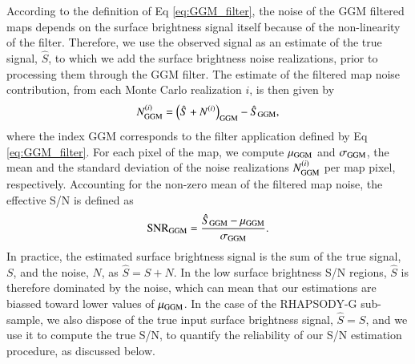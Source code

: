 \documentclass[traditabstract]{aa}
\begin{document}
According to the definition of Eq \ref{eq:GGM_filter}, the noise of the GGM filtered maps depends on the surface brightness signal itself because of the non-linearity of the filter. Therefore, we use the observed signal as an estimate of the true signal, $\hat{S}$, to which we add the surface brightness noise realizations, prior to processing them through the GGM filter. The estimate of the filtered map noise contribution, from each Monte Carlo realization $i$, is then given by
\begin{equation}
        N^{(i)}_{\rm GGM} = \left(\hat{S} + N^{(i)}\right)_{\rm GGM} -  \hat{S}_{\rm GGM},
        \label{eq:GGM_filter_noise}
\end{equation}
where the index GGM corresponds to the filter application defined by Eq \ref{eq:GGM_filter}. For each pixel of the map, we compute $\mu_{\rm GGM}$ and $\sigma_{\rm GGM}$, the mean and the standard deviation of the noise realizations $N^{(i)}_{\rm GGM}$ per map pixel, respectively. Accounting for the non-zero mean of the filtered map noise, the effective S/N is defined as 
\begin{equation}
{\rm SNR}_{\rm GGM} = \frac{\hat{S}_{\rm GGM} - \mu_{\rm GGM}}{\sigma_{\rm GGM}}.
        \label{eq:GGM_filter_snr}
\end{equation}
In practice, the estimated surface brightness signal is the sum of the true signal, $S$, and the noise, $N$, as $\hat{S} = S + N$. In the low surface brightness S/N regions, $\hat{S}$ is therefore dominated by the noise, which can mean that our estimations are biassed toward lower values of $\mu_{\rm GGM}$. In the case of the RHAPSODY-G sub-sample, we also dispose of the true input surface brightness signal, $\hat{S} = S$, and we use it to compute the true S/N, to quantify the reliability of our S/N estimation procedure, as discussed below.
\end{document}
